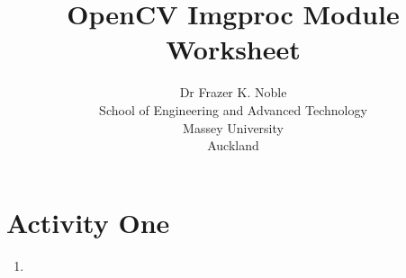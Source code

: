 \documentclass[12pt, A4]{article}
\title{OpenCV Imgproc Module Worksheet}
\author{Dr Frazer K. Noble\\[0.25cm]
    School of Engineering and Advanced Technology\\
    Massey University\\
    Auckland}
\date{}
\begin{document}
\maketitle

\section*{Activity One}

\begin{enumerate}[label=(\alph*)]

    \item 

\end{enumerate}
\end{document}
